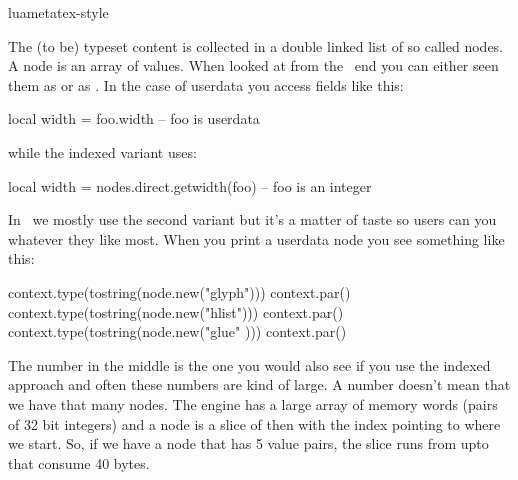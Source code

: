 












\environment luametatex-style

\startdocument[title=Nodes]

\startsection[title={Introduction}]

The (to be) typeset content is collected in a double linked list of so called
nodes. A node is an array of values. When looked at from the \LUA\ end you can
either seen them as  or as . In the case of userdata you access fields like this:

\starttyping [option=LUA]
local width = foo.width -- foo is userdata
\stoptyping

while the indexed variant uses:

\starttyping [option=LUA]
local width = nodes.direct.getwidth(foo) -- foo is an integer
\stoptyping

In \CONTEXT\ we mostly use the second variant but it's a matter of taste so users
can you whatever they like most. When you print a userdata node you see something
like this:

\startlines
\startluacode
context.type(tostring(node.new("glyph"))) context.par()
context.type(tostring(node.new("hlist"))) context.par()
context.type(tostring(node.new("glue" ))) context.par()
\stopluacode
\stoplines

The number in the middle is the one you would also see if you use the indexed
approach and often these numbers are kind of large. A number 
doesn't mean that we have that many nodes. The engine has a large array of memory
words (pairs of 32 bit integers) and a node is a slice of then with the index
pointing to where we start. So, if we have a node that has 5 value pairs, the
slice runs from  upto  that consume 40 bytes.

